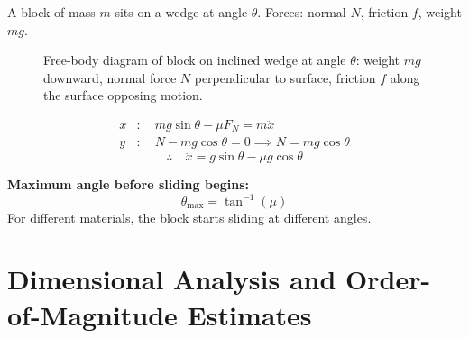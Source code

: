 \begin{example}
A block of mass $m$ sits on a wedge at angle $\theta$. Forces: normal $N$, friction $f$, weight $mg$.

\begin{figure}[H]
\begin{center}
\end{center}
\caption{Free-body diagram of block on inclined wedge at angle $\theta$: weight $mg$ downward, normal force $N$ perpendicular to surface, friction $f$ along the surface opposing motion.}
\label{fig:friction_wedge}
\end{figure}

\begin{align*}
x&: \quad mg\sin\theta - \mu F_N = m\ddot{x} \\
y&: \quad N - mg\cos\theta = 0 \implies N = mg\cos\theta
\end{align*}
\[
\therefore\quad \ddot{x} = g\sin\theta - \mu g\cos\theta
\]

\textbf{Maximum angle before sliding begins:}
\[
\theta_{\max} = \tan^{-1}(\mu)
\]
For different materials, the block starts sliding at different angles.
\end{example}


\chapter{Dimensional Analysis and Order-of-Magnitude Estimates}

